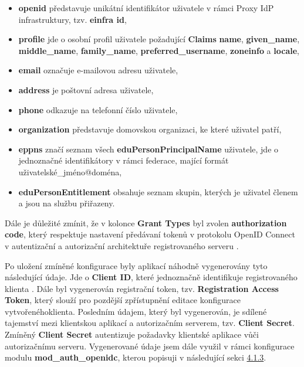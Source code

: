\documentclass[
  printed, %
  twoside, %
  table,   %
  nolof,     %
  nolot,     %
]{fithesis3}
\begin{document}
\begin{itemize}
    \item \textbf{openid} představuje unikátní identifikátor uživatele v rámci Proxy IdP infrastruktury, tzv. \textbf{einfra id},
    \item \textbf{profile} jde o osobní profil uživatele požadující \textbf{Claims} \textbf{name}, \textbf{given\_name}, \textbf{middle\_name}, \textbf{family\_name}, \textbf{preferred\_username}, \textbf{zoneinfo} a \textbf{locale},
    \item \textbf{email} označuje e-mailovou adresu uživatele,
    \item \textbf{address} je poštovní adresa uživatele,
    \item \textbf{phone} odkazuje na telefonní číslo uživatele,
    
    \item \textbf{organization} představuje domovskou organizaci, ke které uživatel patří,
    \item \textbf{eppns} značí seznam všech \textbf{eduPersonPrincipalName} uživatele, jde o jednoznačné identifikátory v rámci federace, mající formát uživatelské\_jméno@doména,  
    \item \textbf{eduPersonEntitlement} obsahuje seznam skupin, kterých je uživatel členem a jsou na službu  přiřazeny.
    
\end{itemize}
Dále je důležité zmínit, že v kolonce \textbf{Grant Types} byl zvolen \textbf{authorization code}, který respektuje nastavení předávaní tokenů v protokolu OpenID Connect v autentizační a autorizační architektuře registrovaného serveru .  \par

Po uložení zmíněné konfigurace byly aplikací náhodně vygenerovány tyto následující údaje. Jde o \textbf{Client ID}, které jednoznačně identifikuje registrovaného klienta . Dále byl vygenerován registrační token, tzv. \textbf{Registration Access Token}, který slouží pro pozdější zpřístupnění editace konfigurace vytvořeného\break klienta. Posledním údajem, který byl vygenerován, je sdílené tajemství mezi klientskou aplikací a autorizačním serverem, tzv. \textbf{Client Secret}. Zmíněný \textbf{Client Secret} autentizuje požadavky klientské aplikace vůči autorizačnímu serveru. Vygenerované údaje jsem dále využil v rámci konfigurace modulu \textbf{mod\_auth\_openidc}, kterou popisuji v následující sekci \hyperref[sec:mod-conf]{4.1.3}.
\end{document}
